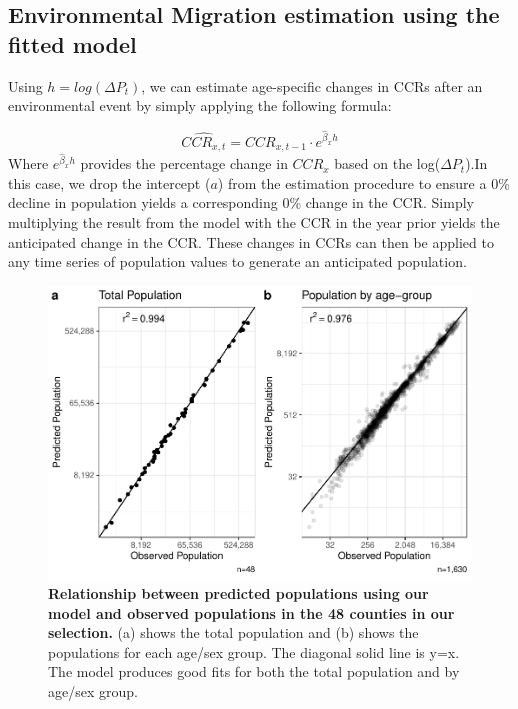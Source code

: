 \documentclass[12pt]{article}
\begin{document}
\hypertarget{environmental-migration-estimation-using-the-fitted-model}{%
\subsection{Environmental Migration estimation using the fitted
model}\label{environmental-migration-estimation-using-the-fitted-model}}

Using \(h=log(\Delta P_t)\), we can estimate age-specific changes in
CCRs after an environmental event by simply applying the following
formula:

\[\hat{CCR_{x,t}} = CCR_{x,t-1} \cdot e^{\hat\beta_xh}\] Where
\(e^{\hat\beta_xh}\) provides the percentage change in \(CCR_x\) based
on the log(\(\Delta{P_t}\)).In this case, we drop the intercept (\(a\))
from the estimation procedure to ensure a 0\% decline in population
yields a corresponding 0\% change in the CCR. Simply multiplying the
result from the model with the CCR in the year prior yields the
anticipated change in the CCR. These changes in CCRs can then be applied
to any time series of population values to generate an anticipated
population.

\begin{figure}
\centering
\includegraphics{manuscript_files/figure-latex/evalfig-1.pdf}
\caption{\textbf{Relationship between predicted populations using our model and observed populations in the 48 counties in our selection.}
(a) shows the total population and (b) shows the populations for each
age/sex group. The diagonal solid line is y=x. The model produces good
fits for both the total population and by age/sex group.
\label{EvalFig}}
\end{figure}
\end{document}
